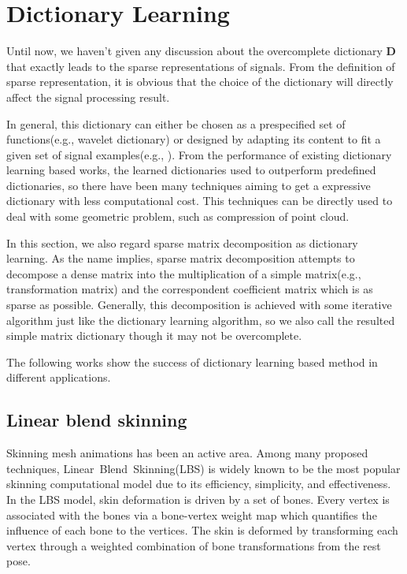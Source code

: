 \section{Dictionary Learning}
\label{sec:DictionaryLearning}

Until now, we haven't given any discussion about the overcomplete dictionary $\mathbf{D}$ that exactly leads to the sparse representations of signals.
From the definition of sparse representation, it is obvious that the choice of the dictionary will directly affect the signal processing result.

In general, this dictionary can either be chosen as a prespecified set of functions(e.g., wavelet dictionary) or designed by adapting its content to fit a given set of signal examples(e.g., \cite{aharon2006svd}).
From the performance of existing dictionary learning based works, the learned dictionaries used to outperform predefined dictionaries,
so there have been many techniques aiming to get a expressive dictionary with less computational cost.
This techniques can be directly used to deal with some geometric problem, such as compression of point cloud\cite{digne2014self}.

In this section, we also regard sparse matrix decomposition as dictionary learning.
As the name implies, sparse matrix decomposition attempts to decompose a dense matrix into the multiplication of a simple matrix(e.g., transformation matrix\cite{le2012smooth}) and the correspondent coefficient matrix which is as sparse as possible.
Generally, this decomposition is achieved with some iterative algorithm just like the dictionary learning algorithm,
so we also call the resulted simple matrix dictionary though it may not be overcomplete.

The following works show the success of dictionary learning based method in different applications.

\subsection{Linear blend skinning}

Skinning mesh animations has been an active area.
Among many proposed techniques, Linear~Blend~Skinning(LBS) is widely known to be the most popular skinning computational model due to its efficiency, simplicity, and effectiveness.
In the LBS model, skin deformation is driven by a set of bones.
Every vertex is associated with the bones via a bone-vertex weight map which quantifies the influence of each bone to the vertices.
The skin is deformed by transforming each vertex through a weighted combination of bone transformations from the rest pose.

